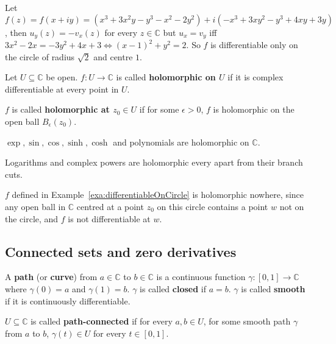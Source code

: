 \begin{example}\label{exa:differentiableOnCircle}
	Let $f(z) = f(x + iy) = (x^3 + 3x^2 y - y^3 - x^2 - 2y^2) + i(-x^3 + 3xy^2 - y^3 + 4xy + 3y)$, then $u_y(z) = -v_x(z)$ for every $z \in \mathbb{C}$ but $u_x = v_y$ iff $3x^2 - 2x = -3y^2 + 4x + 3 \Longleftrightarrow {(x - 1)}^2 + y^2 = 2$. So $f$ is differentiable only on the circle of radius $\sqrt{2}$ and centre $1$.
\end{example}

\begin{definition}
	Let $U \subseteq \mathbb{C}$ be open. $f: U \to \mathbb{C}$ is called \textbf{holomorphic on $U$} if it is complex differentiable at every point in $U$.

	$f$ is called \textbf{holomorphic at $z_0 \in U$} if for some $\epsilon > 0$, $f$ is holomorphic on the open ball $B_{\epsilon}(z_0)$.
\end{definition}

\begin{example}
	$\exp, \sin, \cos, \sinh, \cosh$ and polynomials are holomorphic on $\mathbb{C}$.
\end{example}

\begin{example}
	Logarithms and complex powers are holomorphic every apart from their branch cuts.
\end{example}

\begin{example}
	$f$ defined in Example~\ref{exa:differentiableOnCircle} is holomorphic nowhere, since any open ball in $\mathbb{C}$ centred at a point $z_0$ on this circle contains a point $w$ not on the circle, and $f$ is not differentiable at $w$.
\end{example}

\subsection{Connected sets and zero derivatives}

\begin{definition}
	A \textbf{path} (or \textbf{curve}) from $a \in \mathbb{C}$ to $b \in \mathbb{C}$ is a continuous function $\gamma: [0, 1] \rightarrow \mathbb{C}$ where $\gamma(0) = a$ and $\gamma(1) = b$. $\gamma$ is called \textbf{closed} if $a = b$. $\gamma$ is called \textbf{smooth} if it is continuously differentiable.
\end{definition}

\begin{definition}
	$U \subseteq \mathbb{C}$ is called \textbf{path-connected} if for every $a, b \in U$, for some smooth path $\gamma$ from $a$ to $b$, $\gamma(t) \in U$ for every $t \in [0, 1]$.
\end{definition}


